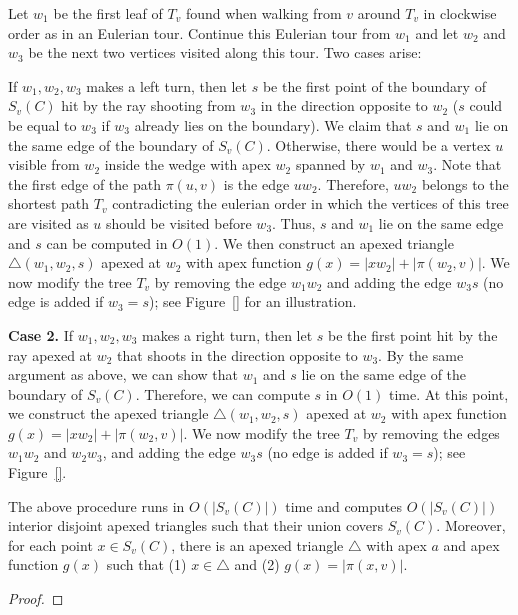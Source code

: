 \documentclass[a4paper,UKenglish]{lipics}
\newcommand{\fn}[2]{\ensuremath{S_{\scriptscriptstyle #1}(#2)}}
\newcommand{\g}[2]{\ensuremath{|\pi(#1, #2)|}}
\newcommand{\p}[2]{\ensuremath{\pi(#1, #2)}}
\begin{document}
Let $w_1$ be the first leaf of $T_v$ found when walking from $v$ around $T_v$ in clockwise order as in an Eulerian tour.
Continue this Eulerian tour from $w_1$ and let $w_2$ and $w_3$ be the next two vertices visited along this tour. Two cases arise:

 If $w_1, w_2, w_3$ makes a left turn, then let $s$ be the first point of the boundary of $\fn{v}{C}$ hit by the ray shooting from $w_3$ in the direction opposite to $w_2$ ($s$ could be equal to $w_3$ if $w_3$ already lies on the boundary).
We claim that $s$ and $w_1$ lie on the same edge of the boundary of $\fn{v}{C}$. 
Otherwise, there would be a vertex $u$ visible from $w_2$ inside the wedge with apex $w_2$ spanned by $w_1$ and $w_3$.
Note that the first edge of the path $\p{u}{v}$ is the edge $uw_2$. Therefore, $uw_2$ belongs to the shortest path $T_v$ contradicting the eulerian order in which the vertices of this tree are visited as $u$ should be visited before $w_3$. Thus, $s$ and $w_1$ lie on the same edge and $s$ can be computed in $O(1)$.
We then construct an apexed triangle $\triangle(w_1, w_2, s)$ apexed at $w_2$ with apex function $g(x) = |x w_2| + \g{w_2}{v}$.
We now modify the tree $T_v$ by removing the edge $w_1w_2$ and adding the edge $w_3s$ (no edge is added if $w_3 = s$); see Figure~\ref{} for an illustration.

\textbf{Case 2.} If $w_1, w_2, w_3$ makes a right turn, then let $s$ be the first point hit by the ray apexed at $w_2$ that shoots in the direction opposite to $w_3$. By the same argument as above, we can show that $w_1$ and $s$ lie on the same edge of the boundary of $\fn{v}{C}$. Therefore, we can compute $s$ in $O(1)$ time. At this point, we construct the apexed triangle $\triangle(w_1, w_2, s)$ apexed at $w_2$ with apex function $g(x) = |x w_2| + \g{w_2}{v}$.
We now modify the tree $T_v$ by removing the edges $w_1w_2$ and $w_2w_3$, and adding the edge $w_3s$ (no edge is added if $w_3 = s$); see Figure~\ref{}.

\begin{lemma}\label{lemma:Triangles inside funnels}
The above procedure runs in $O(|\fn{v}{C}|)$ time and computes $O(|\fn{v}{C}|)$ interior disjoint apexed triangles such that their union covers $\fn{v}{C}$. Moreover, for each point $x\in \fn{v}{C}$, there is an apexed triangle $\triangle$ with apex $a$ and apex function $g(x)$ such that (1) $x\in \triangle$ and (2) $g(x) = \g{x}{v}$.
\end{lemma}
\begin{proof}

\end{proof}
\end{document}
